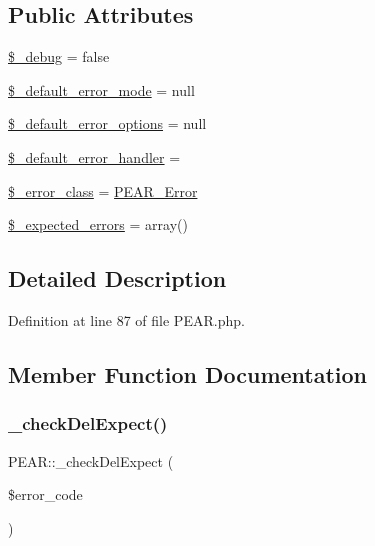 \subsection*{Public Attributes}
\begin{DoxyCompactItemize}
\item 
\hyperlink{classPEAR_ae715267905b370968c01b81c9fda0bfe}{\$\+\_\+debug} = false
\item 
\hyperlink{classPEAR_a6b3ff3d78a7b1d62c0de6b1190046a89}{\$\+\_\+default\+\_\+error\+\_\+mode} = null
\item 
\hyperlink{classPEAR_ac71147b819daa267f29980e941efa23c}{\$\+\_\+default\+\_\+error\+\_\+options} = null
\item 
\hyperlink{classPEAR_acacb3a3941983155bd31bdb94982e4f3}{\$\+\_\+default\+\_\+error\+\_\+handler} = \textquotesingle{}\textquotesingle{}
\item 
\hyperlink{classPEAR_a6519b9822433b9dc3db0def7508e2b61}{\$\+\_\+error\+\_\+class} = \textquotesingle{}\hyperlink{classPEAR__Error}{P\+E\+A\+R\+\_\+\+Error}\textquotesingle{}
\item 
\hyperlink{classPEAR_ae20c719eaa8316ed0bd6cc83eaa6d0ac}{\$\+\_\+expected\+\_\+errors} = array()
\end{DoxyCompactItemize}


\subsection{Detailed Description}


Definition at line 87 of file P\+E\+A\+R.\+php.



\subsection{Member Function Documentation}
\mbox{\label{classPEAR_a6350d6f88347be3704dc5967915a7ada}} 
\subsubsection{\texorpdfstring{\+\_\+check\+Del\+Expect()}{\_checkDelExpect()}}
{\footnotesize\ttfamily P\+E\+A\+R\+::\+\_\+check\+Del\+Expect (\begin{DoxyParamCaption}\item[{}]{\$error\+\_\+code }\end{DoxyParamCaption})}

